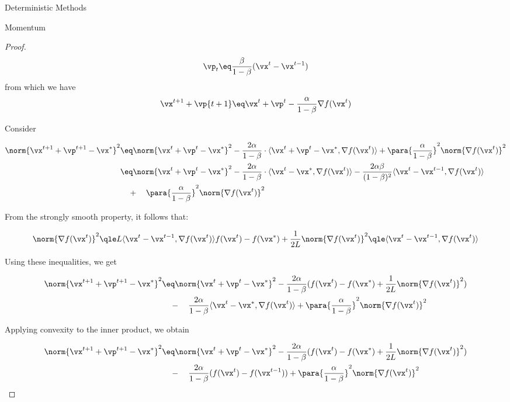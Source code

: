\documentclass{article}
\begin{document}
\begin{psection}{Deterministic Methods}
\begin{psubsection}{Momentum}
\begin{theorem}
\begin{proof}
			\begin{equation*}
				\vp_t \eq \frac{\beta}{1-\beta}(\vx^t-\vx^{t-1})    
			\end{equation*}
			from which we have
			\begin{equation*}
				\vx^{t+1}+\vp{t+1} \eq \vx^t+\vp^t-\frac{\alpha}{1-\beta}\nabla f(\vx^t)    
			\end{equation*}

			Consider

			\begin{align*}
				\norm{\vx^{t+1}+\vp^{t+1}-\vx^*}^2 &\eq \norm{\vx^{t}+\vp^{t}-\vx^*}^2-\frac{2\alpha}{1-\beta}\cdot\langle\vx^{t}+\vp^{t}-\vx^*,\nabla f(\vx^t)\rangle + \para{\frac{\alpha}{1-\beta}}^2\norm{\nabla f(\vx^t)}^2\\
				&\eq \norm{\vx^{t}+\vp^{t}-\vx^*}^2-\frac{2\alpha}{1-\beta} \cdot \langle\vx^{t}-\vx^*,\nabla f(\vx^t)\rangle -\frac{2\alpha\beta}{(1-\beta)^2}\langle\vx^{t}-\vx^{t-1},\nabla f(\vx^t)\rangle\\ &\quad+\quad \para{\frac{\alpha}{1-\beta}}^2\norm{\nabla f(\vx^t)}^2
			\end{align*}

			From the strongly smooth property, it follows that:

			\begin{equation}
				\norm{\nabla f(\vx^t)}^2 \qle L\langle\vx^{t}-\vx^{t-1},\nabla f(\vx^t)\rangle\\
				f(\vx^t) - f(\vx^*) + \frac{1}{2L}\norm{\nabla f(\vx^t)}^2 \qle \langle\vx^{t}-\vx^{t-1},\nabla f(\vx^t)\rangle
			\end{equation}

			Using these inequalities, we get

			\begin{align*}
				\norm{\vx^{t+1}+\vp^{t+1}-\vx^*}^2 &\eq \norm{\vx^{t}+\vp^{t}-\vx^*}^2-\frac{2\alpha}{1-\beta}(f(\vx^t) - f(\vx^*) + \frac{1}{2L}\norm{\nabla f(\vx^t)}^2) \\
				&\quad-\quad \frac{2\alpha}{1-\beta}\langle\vx^{t} -\vx^*,\nabla f(\vx^t)\rangle + \para{\frac{\alpha}{1-\beta}}^2\norm{\nabla f(\vx^t)}^2
			\end{align*}

			Applying convexity to the inner product, we obtain

			\begin{align*}
				\norm{\vx^{t+1}+\vp^{t+1}-\vx^*}^2 &\eq \norm{\vx^{t}+\vp^{t}-\vx^*}^2-\frac{2\alpha}{1-\beta}(f(\vx^t) - f(\vx^*) + \frac{1}{2L}\norm{\nabla f(\vx^t)}^2) \\
				&\quad-\quad\frac{2\alpha}{1-\beta}(f(\vx^t)-f(\vx^{t-1}))+\para{\frac{\alpha}{1-\beta}}^2\norm{\nabla f(\vx^t)}^2
			\end{align*}


\end{proof}
\end{theorem}
\end{psubsection}
\end{psection}
\end{document}
